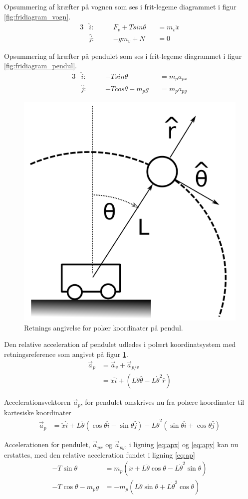 Opsummering af kræfter på vognen som ses i frit-legeme diagrammet i figur \ref{fig:fridiagram_vogn}. 
\begin{alignat}{3}
&\hat{i} : \quad && F_v + T sin{\theta} && = m_v \ddot{x} \label{eq:vogn_x}\\
&\hat{j} : \quad && -g m_v + N && = 0 
\end{alignat}

Opsummering af kræfter på pendulet som ses i frit-legeme diagrammet i figur \ref{fig:fridiagram_pendul}.
\begin{alignat}{3}
&\hat{i} : \quad &&-T sin{\theta} &&= m_p a_{px}\label{eq:apx}\\
&\hat{j} : \quad &&-T cos{\theta} - m_p g &&= m_p a_{py}\label{eq:apy} 
\end{alignat}

\begin{figure}
	\centering
	\includegraphics[width=.3\textwidth]{billeder/pendul_vogn_polaer.png}
	\caption{Retnings angivelse for polær koordinater på pendul.}
	\label{fig:pendul_vogn_polaer}
\end{figure}

Den relative acceleration af pendulet udledes i polært koordinatsystem med retningsreference som angivet på figur \ref{fig:pendul_vogn_polaer}. 
\begin{align}
\vec{a}_p &= \vec{a}_v + \vec{a}_{p/v} \\
&= \ddot{x} \hat{i} + \left( L\ddot{\theta}\hat{\theta} - L\dot{\theta}^2\hat{r} \right)
\end{align}

Accelerationsvektoren $\vec{a}_p$, for pendulet omskrives nu fra polære koordinater til kartesiske koordinater  
\begin{align}
\vec{a}_p &=  \ddot{x} \hat{i} 
				+ L\ddot{\theta} \left( \cos{\theta}\hat{i} - \sin{\theta}\hat{j} \right) 
				- L\dot{\theta}^2 \left( \sin{\theta}\hat{i} + \cos{\theta}\hat{j} \right) \label{eq:ap}
\end{align} 

Accelerationen for pendulet, $\vec{a}_{px}$ og $\vec{a}_{py}$, i ligning \ref{eq:apx} og \ref{eq:apy} kan nu erstattes, med den relative acceleration fundet i ligning \ref{eq:ap}
\begin{align}
-T\sin{\theta} &= m_p \left( \ddot{x} + L\ddot{\theta}\cos{\theta} - L\dot{\theta}^2\sin{\theta} \right)  \label{eq:pendul_x2}\\
-T\cos{\theta} - m_p g &=  -m_p \left( L\ddot{\theta}\sin{\theta} + L\dot{\theta}^2\cos{\theta}  \right) \label{eq:pendul_y2}
\end{align} 

